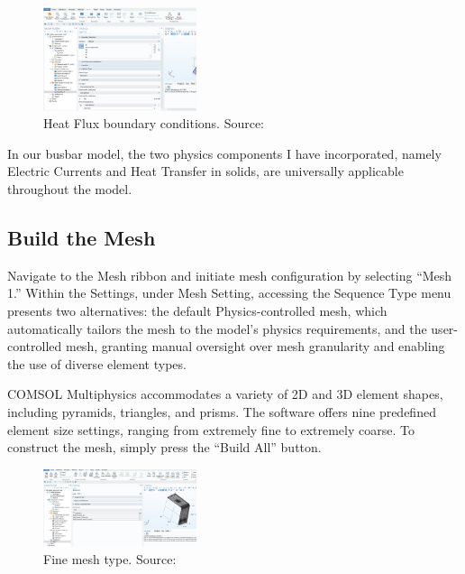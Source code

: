 \begin{figure}[ht!]
  \centering
  \includegraphics[width=0.4\textwidth]{Chapters/Figures/Chapter 3 Figures/Heat Flux Boundary Conditions.png}
  \caption{Heat Flux boundary conditions. Source: \cite{multiphysics__modeling_nodate}}
  \label{fig:Heat Flux boundary conditions.}
\end{figure}

In our busbar model, the two physics components I have incorporated, namely Electric Currents and Heat Transfer in solids, are universally applicable throughout the model.

\subsection{Build the Mesh}
Navigate to the Mesh ribbon and initiate mesh configuration by selecting ``Mesh 1.'' Within the Settings, under Mesh Setting, accessing the Sequence Type menu presents two alternatives: the default Physics-controlled mesh, which automatically tailors the mesh to the model's physics requirements, and the user-controlled mesh, granting manual oversight over mesh granularity and enabling the use of diverse element types.

COMSOL Multiphysics accommodates a variety of 2D and 3D element shapes, including pyramids, triangles, and prisms. The software offers nine predefined element size settings, ranging from extremely fine to extremely coarse. To construct the mesh, simply press the ``Build All'' button.

\begin{figure}[ht!]
  \centering
  \includegraphics[width=0.4\textwidth]{Chapters/Figures/Chapter 3 Figures/Fine Mesh.png}
  \caption{Fine mesh type. Source: \cite{multiphysics__modeling_nodate}}
  \label{fig:Fine mesh type.}
\end{figure}

